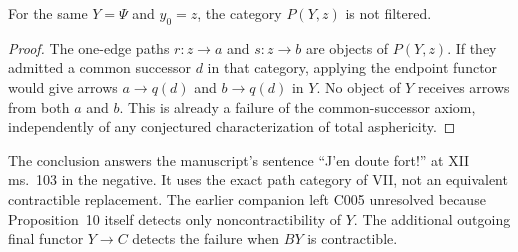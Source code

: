 \begin{proposition}\label{G:notfiltered}
For the same $Y=\Psi$ and $y_0=z$, the category $P(Y,z)$ is not filtered.
\end{proposition}

\begin{proof}
The one-edge paths $r:z\to a$ and $s:z\to b$ are objects of $P(Y,z)$. If they admitted a common successor $d$ in that category, applying the endpoint functor would give arrows $a\to q(d)$ and $b\to q(d)$ in $Y$. No object of $Y$ receives arrows from both $a$ and $b$. This is already a failure of the common-successor axiom, independently of any conjectured characterization of total asphericity.
\end{proof}

The conclusion answers the manuscript's sentence ``J'en doute fort!'' at XII ms.~103 in the negative. It uses the exact path category of VII, not an equivalent contractible replacement. The earlier companion left C005 unresolved because Proposition~10 itself detects only noncontractibility of $Y$. The additional outgoing final functor $Y\to C$ detects the failure when $BY$ is contractible.
